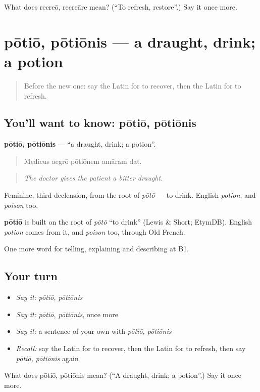 \begin{tcolorbox}[breakable,colback=teal!4,colframe=teal!35!black,title={Before you move on}]
What does recreō, recreāre mean? (\textquotedblleft{}To refresh, restore\textquotedblright{}.) Say it once more.
\end{tcolorbox}
\section[pōtiō, pōtiōnis]{pōtiō, pōtiōnis — a draught, drink; a potion}

\label{lesson:LA-C526-potio}



\begin{quote}
Before the new one: say the Latin for to recover, then the Latin for to refresh.
\end{quote}

\subsection*{You'll want to know: pōtiō, pōtiōnis}
\textbf{pōtiō, pōtiōnis} — \textquotedblleft{}a draught, drink; a potion\textquotedblright{}.

\begin{quote}
Medicus aegrō pōtiōnem amāram dat.
\end{quote}

\begin{quote}
\emph{The doctor gives the patient a bitter draught.}
\end{quote}

Feminine, third declension, from the root of \emph{pōtō} — to drink. English \emph{potion}, and \emph{poison} too.

\begin{cousinweb}
\textbf{pōtiō} is built on the root of \emph{pōtō} \textquotedblleft{}to drink\textquotedblright{} (Lewis \& Short; EtymDB). English \emph{potion} comes from it, and \emph{poison} too, through Old French.
\end{cousinweb}

\begin{grammarlens}[title={What you've built}]
One more word for telling, explaining and describing at B1.
\end{grammarlens}

\subsection*{Your turn}
\begin{itemize}
\raggedright
  \item \emph{Say it:} \emph{pōtiō, pōtiōnis}
  \item \emph{Say it:} \emph{pōtiō, pōtiōnis}, once more
  \item \emph{Say it:} a sentence of your own with \emph{pōtiō, pōtiōnis}
  \item \emph{Recall:} say the Latin for to recover, then the Latin for to refresh, then say \emph{pōtiō, pōtiōnis} again
\end{itemize}

\begin{tcolorbox}[breakable,colback=teal!4,colframe=teal!35!black,title={Before you move on}]
What does pōtiō, pōtiōnis mean? (\textquotedblleft{}A draught, drink; a potion\textquotedblright{}.) Say it once more.
\end{tcolorbox}

